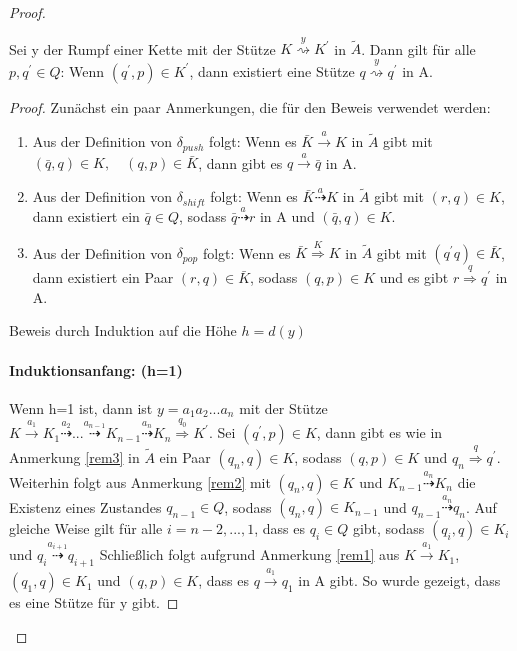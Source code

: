 \begin{proof}
\begin{lemma}
\label{lemma_deter2}
Sei y der Rumpf einer Kette mit der Stütze $K \stackrel{y}{\rightsquigarrow} K^\prime$ in $\tilde{A}$. Dann gilt für alle $p, q^\prime \in Q$: Wenn $(q^\prime, p) \in K^\prime$, dann existiert eine Stütze $q \stackrel{y}{\rightsquigarrow} q^\prime$ in A.
\end{lemma}
\begin{proof}
Zunächst ein paar Anmerkungen, die für den Beweis verwendet werden:
\renewcommand{\labelenumi}{\roman{enumi})}
\begin{enumerate}
\item
Aus der Definition von $\delta_{push}$ folgt: Wenn es $\bar{K} \stackrel{a}{\rightarrow} K$ in $\tilde{A}$ gibt mit $(\bar{q}, q) \in K, \quad (q,p) \in \bar{K}$, dann gibt es $q \stackrel{a}{\rightarrow} \bar{q}$ in A.
\label{rem1}
\item
Aus der Definition von $\delta_{shift}$ folgt: Wenn es $\bar{K} \stackrel{a}{\dashrightarrow} K$ in $\tilde{A}$ gibt mit $(r,q) \in K$, dann existiert ein $\bar{q} \in Q$, sodass $\bar{q} \stackrel{a}{\dashrightarrow} r$ in A und $(\bar{q}, q) \in K$.
\label{rem2}
\item
Aus der Definition von $\delta_{pop}$ folgt: Wenn es $\bar{K} \stackrel{K}{\Rightarrow} K$ in $\tilde{A}$ gibt mit $(q^\prime q) \in \bar{K}$, dann existiert ein Paar $(r,q) \in \bar{K}$, sodass $(q,p)\in K$ und es gibt $r \stackrel{q}{\Rightarrow} q^\prime$ in A.
\label{rem3}
\end{enumerate}

Beweis durch Induktion auf die Höhe $h=d(y)$ 
\paragraph*{Induktionsanfang: (h=1)}
Wenn h=1 ist, dann ist $y=a_1a_2...a_n$ mit der Stütze $K\stackrel{a_1}{\rightarrow} K_1 \stackrel{a_2}{\dashrightarrow} ... \stackrel{a_{n-1}}{\dashrightarrow} K_{n-1} \stackrel{a_n}{\dashrightarrow} K_n \stackrel {q_0} {\Rightarrow} K^\prime.$ Sei $(q^\prime, p) \in K$, dann gibt es wie in Anmerkung \ref{rem3} in $\tilde{A}$ ein Paar $(q_n, q) \in K$, sodass $(q,p) \in K$ und $q_n \stackrel{q}{\Rightarrow} q^\prime$. Weiterhin folgt aus Anmerkung \ref{rem2} mit $(q_n, q) \in K$ und  $K_{n-1} \stackrel{a_n}{\dashrightarrow} K_n$ die Existenz eines Zustandes $q_{n-1} \in Q$, sodass $(q_n,q) \in K_{n-1}$ und $q_{n-1} \stackrel{a_n}{\dashrightarrow} q_n$. Auf gleiche Weise gilt für alle $i=n-2,...,1$, dass es $q_i \in Q$ gibt, sodass $(q_i,q) \in K_i$ und $q_i \stackrel{a_{i+1}}{\dashrightarrow} q_{i+1}$ Schließlich folgt aufgrund Anmerkung \ref{rem1} aus $K\stackrel{a_1}{\rightarrow} K_1$, $(q_1, q) \in K_1$ und $(q, p) \in K$, dass es $q \stackrel{a_1}{\rightarrow} q_1$ in A gibt. So wurde gezeigt, dass es eine Stütze für y gibt.

\end{proof}
\end{proof}
